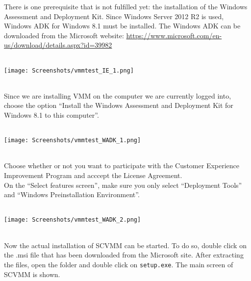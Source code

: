 There is one prerequisite that is not fulfilled yet: the installation of the Windows Assessment and Deployment Kit. Since Windows Server 2012 R2 is used, Windows ADK for Windows 8.1 must be installed. The Windows ADK can be downloaded from the Microsoft website: \url{https://www.microsoft.com/en-us/download/details.aspx?id=39982}
$\;$ \\ \\
\noindent\begin{minipage}{\textwidth}
    \centering
    \texttt{[image: Screenshots/vmmtest\_IE\_1.png]}
\end{minipage}
$\;$ \\ \\
Since we are installing VMM on the computer we are currently logged into, choose the option ``Install the Windows Assessment and Deployment Kit for Windows 8.1 to this computer''.
$\;$ \\ \\
\noindent\begin{minipage}{\textwidth}
    \centering
    \texttt{[image: Screenshots/vmmtest\_WADK\_1.png]}
\end{minipage}
$\;$ \\ \\
Choose whether or not you want to participate with the Customer Experience Improvement Program and acccept the License Agreement. \\
On the ``Select features screen'', make sure you only select ``Deployment Tools'' and ``Windows Preinstallation Environment''. 
$\;$ \\ \\
\noindent\begin{minipage}{\textwidth}
    \centering
    \texttt{[image: Screenshots/vmmtest\_WADK\_2.png]}
\end{minipage}
$\;$ \\ \\
Now the actual installation of SCVMM can be started. To do so, double click on the .msi file that has been downloaded from the Microsoft site. After extracting the files, open the folder and double click on \texttt{setup.exe}. The main screen of SCVMM is shown.
$\;$ \\ \\
